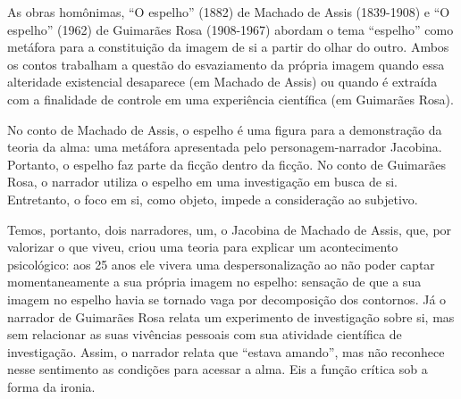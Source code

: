 \begin{multicols}{2}


\par{}As obras homônimas,\allowbreak{} “O espelho” (\allowbreak{}1882)\allowbreak{} de Machado de Assis (\allowbreak{}1839-\allowbreak{}1908)\allowbreak{} e “O espelho” (\allowbreak{}1962)\allowbreak{} de Guimarães Rosa (\allowbreak{}1908-\allowbreak{}1967)\allowbreak{} abordam o tema “espelho” como metáfora para a constituição da imagem de si a partir do olhar do outro.\allowbreak{} Ambos os contos trabalham a questão do esvaziamento da própria imagem quando essa alteridade existencial desaparece (\allowbreak{}em Machado de Assis)\allowbreak{} ou quando é extraída com a finalidade de controle em uma experiência científica (\allowbreak{}em Guimarães Rosa)\allowbreak{}.\allowbreak{}\par{}No conto de Machado de Assis,\allowbreak{} o espelho é uma figura para a demonstração da teoria da alma:\allowbreak{} uma metáfora apresentada pelo personagem-\allowbreak{}narrador Jacobina.\allowbreak{} Portanto,\allowbreak{} o espelho faz parte da ficção dentro da ficção.\allowbreak{} No conto de Guimarães Rosa,\allowbreak{} o narrador utiliza o espelho em uma investigação em busca de si.\allowbreak{} Entretanto,\allowbreak{} o foco em si,\allowbreak{} como objeto,\allowbreak{} impede a consideração ao subjetivo.\allowbreak{}\par{}Temos,\allowbreak{} portanto,\allowbreak{} dois narradores,\allowbreak{} um,\allowbreak{} o Jacobina de Machado de Assis,\allowbreak{} que,\allowbreak{} por valorizar o que viveu,\allowbreak{} criou uma teoria para explicar um acontecimento psicológico:\allowbreak{} aos 25 anos ele vivera uma despersonalização ao não poder captar momentaneamente a sua própria imagem no espelho:\allowbreak{} sensação de que a sua imagem no espelho havia se tornado vaga por decomposição dos contornos.\allowbreak{} Já o narrador de Guimarães Rosa relata um experimento de investigação sobre si,\allowbreak{} mas sem relacionar as suas vivências pessoais com sua atividade científica de investigação.\allowbreak{} Assim,\allowbreak{} o narrador relata que “estava amando”,\allowbreak{} mas não reconhece nesse sentimento as condições para acessar a alma.\allowbreak{} Eis a função crítica sob a forma da ironia.\allowbreak{}

\end{multicols}
